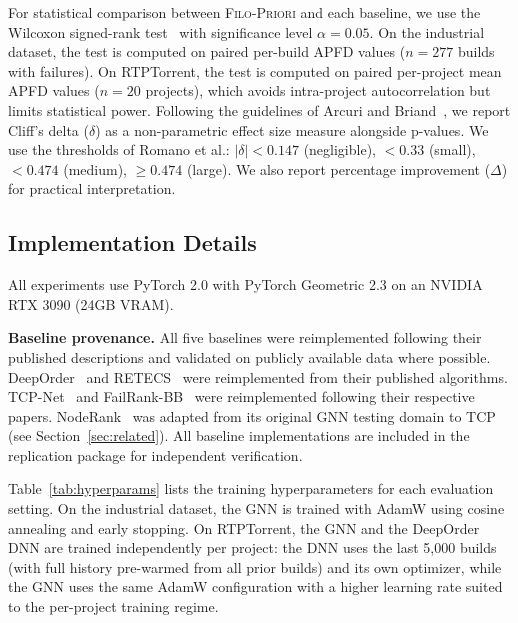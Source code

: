 \documentclass[10pt,journal,compsoc]{IEEEtran}
\newcommand{\filopriori}{\textsc{Filo-Priori}}
\begin{document}
For statistical comparison between \filopriori{} and each baseline, we use the
Wilcoxon signed-rank test~\cite{wilcoxon1945individual} with significance level
$\alpha = 0.05$. On the industrial dataset, the test is computed on paired
per-build APFD values ($n = 277$ builds with failures). On RTPTorrent, the
test is computed on paired per-project mean APFD values ($n = 20$ projects),
which avoids intra-project autocorrelation but limits statistical power.
Following the guidelines of Arcuri and Briand~\cite{arcuri2011practical},
we report Cliff's delta ($\delta$) as a non-parametric effect size measure
alongside p-values. We use the thresholds of Romano et al.:
$|\delta| < 0.147$ (negligible), $< 0.33$ (small), $< 0.474$ (medium),
$\geq 0.474$ (large). We also report percentage improvement ($\Delta$)
for practical interpretation.

\subsection{Implementation Details}

All experiments use PyTorch 2.0 with PyTorch Geometric 2.3 on an NVIDIA RTX
3090 (24GB VRAM).

\textbf{Baseline provenance.} All five baselines were reimplemented
following their published descriptions and validated on publicly available
data where possible. DeepOrder~\cite{chen2023deeporder} and
RETECS~\cite{spieker2017reinforcement} were reimplemented from their
published algorithms. TCP-Net~\cite{abdelkarim2022tcp} and
FailRank-BB~\cite{hernandes2025method} were reimplemented following their
respective papers. NodeRank~\cite{li2024noderank} was adapted from its
original GNN testing domain to TCP (see Section~\ref{sec:related}).
All baseline implementations are included in the replication package for
independent verification.

Table~\ref{tab:hyperparams} lists the training
hyperparameters for each evaluation setting. On the industrial dataset, the
GNN is trained with AdamW using cosine annealing and early stopping. On
RTPTorrent, the GNN and the DeepOrder DNN are trained independently per
project: the DNN uses the last 5,000 builds (with full history pre-warmed
from all prior builds) and its own optimizer, while the GNN uses the same
AdamW configuration with a higher learning rate suited to the per-project
training regime.
\end{document}
